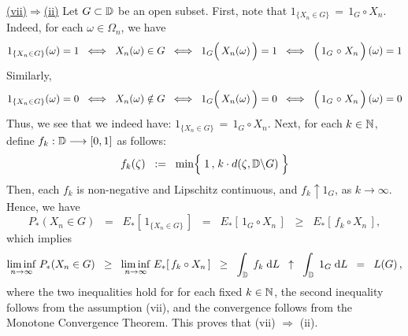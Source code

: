 \vskip 0.5cm \noindent
\underline{(vii)\;$\Longrightarrow$\;(ii)}
\vskip 0.2cm \noindent
Let $G \subset \mathbb{D}$ be an open subset.
First, note that $1_{\{X_{n} \in G\}} \,=\, 1_{G} \circ X_{n}$.
Indeed, for each $\omega \in \Omega_{n}$, we have
\begin{equation*}
1_{\{X_{n} \in G\}}(\omega) = 1
\;\;\Longleftrightarrow\;\; X_{n}(\omega) \in G
\;\;\Longleftrightarrow\;\; 1_{G}\!\left(\,X_{n}(\overset{{\color{white}-}}{\omega})\,\right) = 1
\;\;\Longleftrightarrow\;\; \left(\,1_{G} \overset{{\color{white}-}}{\circ} X_{n}\,\right)(\omega) = 1
\end{equation*}
Similarly,
\begin{equation*}
1_{\{X_{n} \in G\}}(\omega) = 0
\;\;\Longleftrightarrow\;\; X_{n}(\omega) \notin G
\;\;\Longleftrightarrow\;\; 1_{G}\!\left(\,X_{n}(\overset{{\color{white}-}}{\omega})\,\right) = 0
\;\;\Longleftrightarrow\;\; \left(\,1_{G} \overset{{\color{white}-}}{\circ} X_{n}\,\right)(\omega) = 0
\end{equation*}
Thus, we see that we indeed have: $1_{\{X_{n} \in G\}} \,=\, 1_{G} \circ X_{n}$.
Next, for each $k \in \mathbb{N}$, define $f_{k} : \mathbb{D} \longrightarrow [0,1]$ as follows:
\begin{equation*}
f_{k}(\zeta)
\;\; := \;\;
	\min\!\left\{\;1\,\overset{{\color{white}\vert}}{,}\;k \cdot d(\zeta,\D \backslash G)\;\right\}
\end{equation*}
Then, each $f_{k}$ is non-negative and Lipschitz continuous, and
$f_{k} \uparrow 1_{G}$, as $k \longrightarrow \infty$. Hence, we have
\begin{equation*}
P_{*}(X_{n} \in G)
\;\; = \;\; E_{*}\!\left[\,1_{\{X_{n} \in G\}}\,\right]
\;\; = \;\; E_{*}\!\left[\,1_{G} \circ X_{n}\,\right]
\;\; \geq \;\; E_{*}\!\left[\,f_{k} \circ X_{n}\,\right],
\end{equation*}
which implies
\begin{equation*}
\underset{n\rightarrow\infty}{\liminf}\;P_{*}(X_{n} \in G)
\;\; \geq \;\; \underset{n\rightarrow\infty}{\liminf}\;E_{*}\!\left[\,f_{k} \circ X_{n}\,\right]
\;\; \geq \;\; \int_{\mathbb{D}}\; f_{k} \;\textnormal{d} L
\;\; \uparrow \;\; \int_{\mathbb{D}}\; 1_{G} \;\textnormal{d} L
\;\; = \;\; L(G)\,,
\end{equation*}
where the two inequalities hold for for each fixed $k \in \mathbb{N}$, the second inequality follows from the assumption (vii), and
the convergence follows from the Monotone Convergence Theorem.
This proves that (vii) $\Longrightarrow$ (ii).

